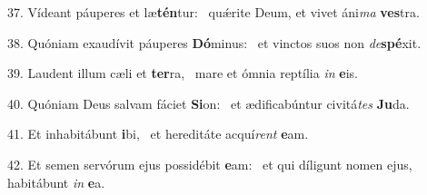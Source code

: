 37. Vídeant páuperes et læ\textbf{tén}tur: \ast\  quǽrite Deum, et vivet áni\textit{ma} \textbf{ves}tra.\

38. Quóniam exaudívit páuperes \textbf{Dó}minus: \ast\  et vinctos suos non \textit{de}\textbf{spé}xit.\

39. Laudent illum cæli et \textbf{ter}ra, \ast\  mare et ómnia reptília \textit{in} \textbf{e}is.\

40. Quóniam Deus salvam fáciet \textbf{Si}on: \ast\  et ædificabúntur civitá\textit{tes} \textbf{Ju}da.\

41. Et inhabitábunt \textbf{i}bi, \ast\  et hereditáte acquí\textit{rent} \textbf{e}am.\

42. Et semen servórum ejus possidébit \textbf{e}am: \ast\  et qui díligunt nomen ejus, habitábunt \textit{in} \textbf{e}a.\

